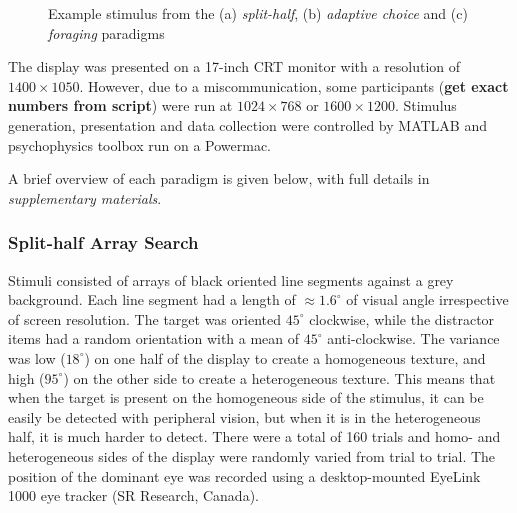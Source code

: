 \documentclass[]{rsos}%
\begin{document}
\begin{figure}
\centering
{}
\caption{Example stimulus from the (a) \textit{split-half}, (b) \textit{adaptive choice} and (c) \textit{foraging} paradigms}
\label{fig:exampleStimuli}
\end{figure}

The display was presented on a 17-inch CRT monitor with a resolution of $1400 \times 
1050$. However, due to a miscommunication, some participants (\textbf{get exact numbers from script}) were run at $1024 \times 768$ or $1600 \times 1200$. Stimulus generation, presentation and data collection were controlled by MATLAB and psychophysics toolbox \cite{brainard1997} run on a Powermac. 

A brief overview of each paradigm is given below, with full details in \textit{supplementary materials}. 

\subsubsection{Split-half Array Search}

Stimuli consisted of arrays of black oriented line segments against a grey background. Each line segment had a length of $\approx$$1.6^{\circ}$ of visual angle irrespective of screen resolution. The target was oriented $45^{\circ}$ clockwise, while the distractor items had a random orientation with a mean of $45^{\circ}$ anti-clockwise. The variance was low ($18^{\circ}$) on one half of the display to create a homogeneous texture, and high ($95^{\circ}$) on the other side to create a heterogeneous texture. This means that when the target is present on the homogeneous side of the stimulus, it can be easily be detected with peripheral vision, but when it is in the heterogeneous half, it is much harder to detect. There were a total of 160 trials and homo- and heterogeneous sides of the display were randomly varied from trial to trial. The position of the dominant eye was recorded using a desktop-mounted EyeLink 1000 eye tracker (SR Research, Canada). 
\end{document}
